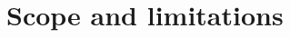 \label{sec:1_3_scope_and_limitations}

\begin{comment}
Here you can tell the reader about the scope of your thesis, kind of meaning describing what you have done in slighter more detail. The question in section 1.2 might be of the general type, but are you using any specific case studies/application scenarios? Are you limited to a specific type of platform? Have you performed experiments in special environments only, etc.? Describe such information here so that the reader does not expect something going beyond this.
\end{comment}

\section{Scope and limitations}



    


    
    
    

    

    
    
   
    

